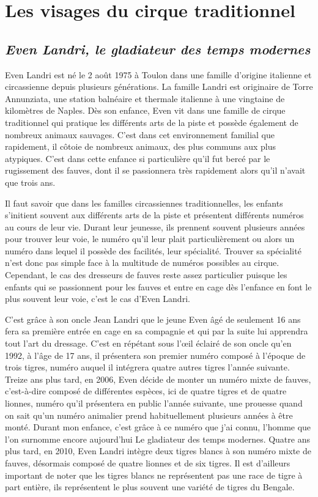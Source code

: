 \chapter{Les visages du cirque traditionnel}
\section*{\textit{Even Landri, le gladiateur des temps modernes}}
Even Landri est né le 2 août 1975 à Toulon dans une famille d'origine italienne et circassienne depuis plusieurs générations. La famille Landri est originaire de Torre Annunziata, une station balnéaire et thermale italienne à une vingtaine de kilomètres de Naples. Dès son enfance, Even vit dans une famille de cirque traditionnel qui pratique les différents arts de la piste et possède également de nombreux animaux sauvages. C'est dans cet environnement familial que rapidement, il côtoie de nombreux animaux, des plus communs aux plus atypiques. C'est dans cette enfance si particulière qu'il fut bercé par le rugissement des fauves, dont il se passionnera très rapidement alors qu'il n'avait que trois ans.

Il faut savoir que dans les familles circassiennes traditionnelles, les enfants s'initient souvent aux différents arts de la piste et présentent différents numéros au cours de leur vie. Durant leur jeunesse, ils prennent souvent plusieurs années pour trouver leur voie, le numéro qu'il leur plait particulièrement ou alors un numéro dans lequel il possède des facilités, leur spécialité. Trouver sa spécialité n'est donc pas simple face à la multitude de numéros possibles au cirque. Cependant, le cas des dresseurs de fauves reste assez particulier puisque les enfants qui se passionnent pour les fauves et entre en cage dès l'enfance en font le plus souvent leur voie, c'est le cas d'Even Landri. 

C'est grâce à son oncle Jean Landri que le jeune Even âgé de seulement 16 ans fera sa première entrée en cage en sa compagnie et qui par la suite lui apprendra tout l'art du dressage. C'est en répétant sous l'œil éclairé de son oncle qu’en 1992, à l'âge de 17 ans, il présentera son premier numéro composé à l'époque de trois tigres, numéro auquel il intégrera quatre autres tigres l'année suivante. Treize ans plus tard, en 2006, Even décide de monter un numéro mixte de fauves, c’est-à-dire composé de différentes espèces, ici de quatre tigres et de quatre lionnes, numéro qu'il présentera en public l'année suivante, une prouesse quand on sait qu'un numéro animalier prend habituellement plusieurs années à être monté. Durant mon enfance, c'est grâce à ce numéro que j'ai connu, l'homme que l'on surnomme encore aujourd'hui Le gladiateur des temps modernes. Quatre ans plus tard, en 2010, Even Landri intègre deux tigres blancs à son numéro mixte de fauves, désormais composé de quatre lionnes et de six tigres. Il est d'ailleurs important de noter que les tigres blancs ne représentent pas une race de tigre à part entière, ils représentent le plus souvent une variété de tigres du Bengale. 

